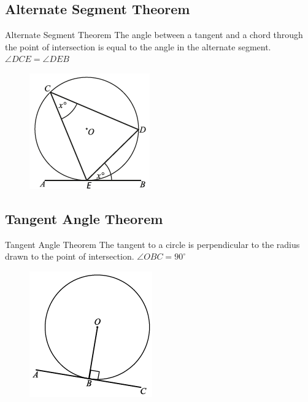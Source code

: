 \documentclass{beamer}
\begin{document}
\subsection{Alternate Segment Theorem}
\begin{frame}{Alternate Segment Theorem}
The angle between a tangent and a chord through the point of intersection is equal to the angle in the alternate segment. $\angle DCE = \angle DEB$

\begin{figure}[h!]
	\centering
	\includegraphics[height=0.5\textheight]{Graphics/Week_13/AlternateSegment.png}
\end{figure}
\end{frame}


\subsection{Tangent Angle Theorem}
\begin{frame}{Tangent Angle Theorem}
The tangent to a circle is perpendicular to the radius drawn to the point of intersection. $\angle OBC = 90^{\circ}$

\begin{figure}[h!]
	\centering
	\includegraphics[height=0.5\textheight]{Graphics/Week_13/RightAngleTangent.png}
\end{figure}
\end{frame}
\end{document}
